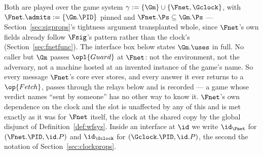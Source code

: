 \documentclass[10pt,oneside,openany]{book}
\theoremstyle{accentdef}
\theoremstyle{accentplain}
\begin{document}
Both are played over the game system $\gamma := \{\Gm\} \cup \{\Fnet,\Gclock\}$, with
$\Fnet.\admits := \{\Gm.\PID\}$ pinned and $\Fnet.\Ps \subseteq \Gm.\Ps$ ---
Section~\ref{sec:sigprops}'s tightness argument transplanted whole, since $\Fnet$'s own fields
already follow $\Fsig$'s pattern rather than the clock's (Section~\ref{sec:fnetfunc}). The
interface box below states $\Gm.\uses$ in full. No caller but $\Gm$ passes $\opl{Guard}$ at $\Fnet$: not the
environment, not the adversary, not a machine hosted at an invented instance of the game's name.
So every message $\Fnet$'s core ever stores, and every answer it ever returns to a $\op{Fetch}$,
passes through the relays below and is recorded --- a game whose verdict names ``sent by someone''
has no other way to know it. $\Fnet$'s own dependence on the clock and the slot is unaffected by
any of this and is met exactly as it was for $\Fnet$ itself, the clock at the shared copy by the
global disjunct of Definition~\ref{def:wfsys}. Inside an interface at $\id$ we write $\id_{\Fnet}$
for $(\Fnet.\PID,\id.P)$ and $\id_{\Gclock}$ for $(\Gclock.\PID,\id.P)$, the second the notation of
Section~\ref{sec:clockprops}.
\end{document}
